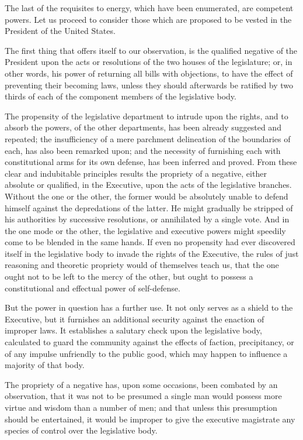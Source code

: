 The last of the requisites to energy, which have been enumerated, are competent powers. Let us proceed to consider those which are proposed to be vested in the President of the United States.

The first thing that offers itself to our observation, is the qualified negative of the President upon the acts or resolutions of the two houses of the legislature; or, in other words, his power of returning all bills with objections, to have the effect of preventing their becoming laws, unless they should afterwards be ratified by two thirds of each of the component members of the legislative body.

The propensity of the legislative department to intrude upon the rights, and to absorb the powers, of the other departments, has been already suggested and repeated; the insufficiency of a mere parchment delineation of the boundaries of each, has also been remarked upon; and the necessity of furnishing each with constitutional arms for its own defense, has been inferred and proved. From these clear and indubitable principles results the propriety of a negative, either absolute or qualified, in the Executive, upon the acts of the legislative branches. Without the one or the other, the former would be absolutely unable to defend himself against the depredations of the latter. He might gradually be stripped of his authorities by successive resolutions, or annihilated by a single vote. And in the one mode or the other, the legislative and executive powers might speedily come to be blended in the same hands. If even no propensity had ever discovered itself in the legislative body to invade the rights of the Executive, the rules of just reasoning and theoretic propriety would of themselves teach us, that the one ought not to be left to the mercy of the other, but ought to possess a constitutional and effectual power of self-defense.

But the power in question has a further use. It not only serves as a shield to the Executive, but it furnishes an additional security against the enaction of improper laws. It establishes a salutary check upon the legislative body, calculated to guard the community against the effects of faction, precipitancy, or of any impulse unfriendly to the public good, which may happen to influence a majority of that body.

The propriety of a negative has, upon some occasions, been combated by an observation, that it was not to be presumed a single man would possess more virtue and wisdom than a number of men; and that unless this presumption should be entertained, it would be improper to give the executive magistrate any species of control over the legislative body.

